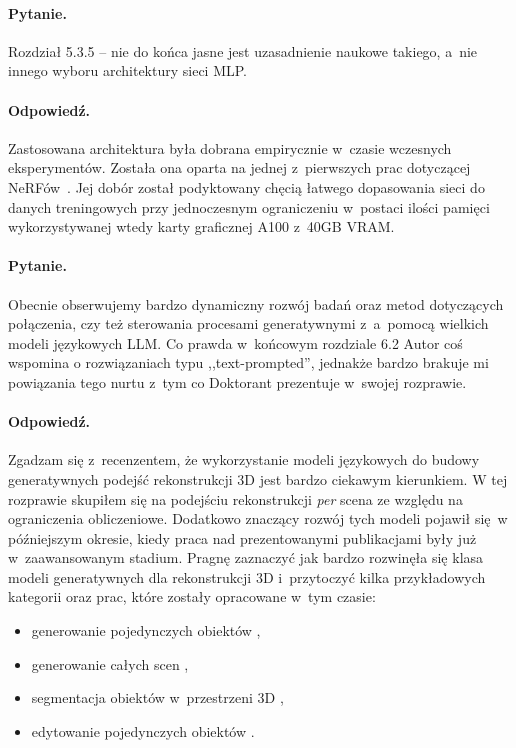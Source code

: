 \documentclass{rebuttal}
\begin{document}
  \responsedelimiter

\paragraph{Pytanie.}
  Rozdział 5.3.5 -- nie do końca jasne jest uzasadnienie naukowe takiego, a~nie
  innego wyboru architektury sieci MLP.
\paragraph{Odpowiedź.}
  Zastosowana architektura była dobrana empirycznie w~czasie wczesnych
  eksperymentów. Została ona oparta na jednej z~pierwszych prac dotyczącej
  NeRFów~\cite{mildenhall2020nerf}. Jej dobór został podyktowany chęcią łatwego
  dopasowania sieci do danych treningowych przy jednoczesnym ograniczeniu
  w~postaci ilości pamięci wykorzystywanej wtedy karty graficznej A100 z~40GB
  VRAM.

  \responsedelimiter

\paragraph{Pytanie.}
  Obecnie obserwujemy bardzo dynamiczny rozwój badań oraz metod dotyczących
  połączenia, czy też sterowania procesami generatywnymi z~a~pomocą wielkich
  modeli językowych LLM. Co prawda w~końcowym rozdziale 6.2 Autor coś wspomina o
  rozwiązaniach typu ,,text-prompted'', jednakże bardzo brakuje mi powiązania
  tego nurtu z~tym co Doktorant prezentuje w~swojej rozprawie.
\paragraph{Odpowiedź.}
  Zgadzam się z~recenzentem, że wykorzystanie modeli językowych do budowy
  generatywnych podejść rekonstrukcji 3D jest bardzo ciekawym kierunkiem. W tej
  rozprawie skupiłem się na podejściu rekonstrukcji \textit{per} scena ze
  względu na ograniczenia obliczeniowe. Dodatkowo znaczący rozwój tych modeli
  pojawił się w późniejszym okresie, kiedy praca nad prezentowanymi publikacjami
  były już w~zaawansowanym stadium. Pragnę zaznaczyć jak bardzo rozwinęła się
  klasa modeli generatywnych dla rekonstrukcji 3D i~przytoczyć kilka
  przykładowych kategorii oraz prac, które zostały opracowane w~tym czasie:
  \begin{itemize}
    \item generowanie pojedynczych obiektów \cite{tang2024dreamgaussian},
    \item generowanie całych scen \cite{bai2025360},
    \item segmentacja obiektów w~przestrzeni 3D \cite{kobayashi2022decomposing},
    \item edytowanie pojedynczych obiektów \cite{haque2023instruct}.
  \end{itemize}

  \responsedelimiter

  \printbibliography[title={Bibliografia}]
\end{document}
